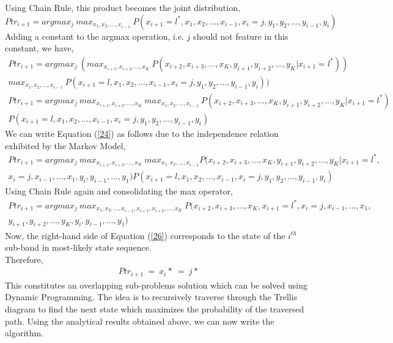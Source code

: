 \documentclass[12pt, draftcls, onecolumn]{IEEEtran}
\begin{document}
Using Chain Rule, this product becomes the joint distribution,
\begin{equation}\label{22}
        Ptr_{i+1}=argmax_j\ max_{x_1,x_2,...,x_{i-1}}\ P(x_{i+1}=l^*,x_1,x_2,...,x_{i-1},x_{i}=j,y_1,y_2,...,y_{i-1},y_{i})
\end{equation}
Adding a constant to the argmax operation, i.e. $j$ should not feature in this constant, we have,
\begin{equation}\label{23}
    \begin{aligned}
        Ptr_{i+1}=argmax_j\ (max_{x_{i+1},x_{i+2},...,x_K}\ P(x_{i+2},x_{i+3},...,x_K,y_{i+1},y_{i+2},...,y_{K}|x_{i+1}=l^*))\\max_{x_1,x_2,...,x_{i-1}}\ P(x_{i+1}=l,x_1,x_2,...,x_{i-1},x_{i}=j,y_1,y_2,...,y_{i-1},y_{i}))
    \end{aligned}
\end{equation}
\begin{equation}\label{24}
    \begin{aligned}
        Ptr_{i+1}=argmax_j\ max_{x_{i+1},x_{i+2},...,x_K}\ max_{x_1,x_2,...,x_{i-1}}\ P(x_{i+2},x_{i+3},...,x_K,y_{i+1},y_{i+2},...,y_{K}|x_{i+1}=l^*)\\P(x_{i+1}=l,x_1,x_2,...,x_{i-1},x_{i}=j,y_1,y_2,...,y_{i-1},y_{i})
    \end{aligned}
\end{equation}
We can write Equation (\ref{24}) as follows due to the independence relation exhibited by the Markov Model,
\begin{equation}\label{25}
    \begin{aligned}
        Ptr_{i+1}=argmax_j\ max_{x_{i+1},x_{i+2},...,x_K}\ max_{x_1,x_2,...,x_{i-1}}P(x_{i+2},x_{i+3},...,x_K,y_{i+1},y_{i+2},...,y_{K}|x_{i+1}=l^*,\\x_{i}=j,x_{i-1},...,x_1,y_{i},y_{i-1},...,y_1)P(x_{i+1}=l,x_1,x_2,...,x_{i-1},x_{i}=j,y_1,y_2,...,y_{i-1},y_{i})
    \end{aligned}
\end{equation}
Using Chain Rule again and consolidating the max operator,
\begin{equation}\label{26}
    \begin{aligned}
        Ptr_{i+1}=argmax_j\ max_{x_1,x_2,...,x_{i-1},x_{i+1},x_{i+2},...,x_K}\ P(x_{i+2},x_{i+3},...,x_K,x_{i+1}=l^*,x_{i}=j,x_{i-1},...,x_1,\\y_{i+1},y_{i+2},...,y_{K},y_{i},y_{i-1},...,y_1)
    \end{aligned}
\end{equation}
Now, the right-hand side of Equation (\ref{26}) corresponds to the state of the $i^{th}$ sub-band in most-likely state sequence.
\\Therefore,
\begin{equation}\label{27}
    \begin{aligned}
        Ptr_{i+1}\ =\ x_i*\ =\ j*
    \end{aligned}
\end{equation}
This constitutes an overlapping sub-problems solution which can be solved using Dynamic Programming. The idea is to recursively traverse through the Trellis diagram to find the next state which maximizes the probability of the traversed path. Using the analytical results obtained above, we can now write the algorithm.
\end{document}

